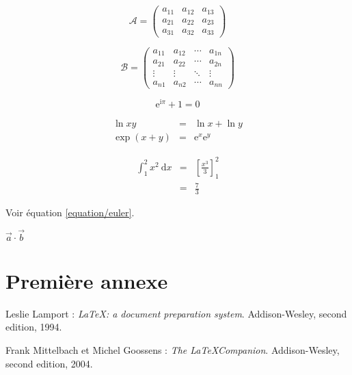 \documentclass[a4paper,11pt]{article}
\newcommand{\diff}{\ \mathrm{d}}
\begin{document}
\[
{\mathcal A} = \left (
\begin{array}{ccc}
a_{11} & a_{12} & a_{13} \\
a_{21} & a_{22} & a_{23} \\
a_{31} & a_{32} & a_{33}
\end{array}
\right )
\]

\[
{\mathcal B} = \left (
\begin{array}{cccc}
a_{11} & a_{12} & \cdots & a_{1n} \\
a_{21} & a_{22} & \cdots & a_{2n} \\
\vdots  & \vdots   & \ddots & \vdots  \\
a_{n1} & a_{n2} & \cdots & a_{nn}
\end{array}
\right )
\]

\begin{equation} \label{equation/euler}
\mathrm{e}^{\mathrm{i}\pi}+1=0
\end{equation}

\begin{eqnarray}
\ln xy                           & = & \ln x + \ln y \\
\exp \left ( x+y \right ) & = & \mathrm{e}^x  \mathrm{e}^y
\end{eqnarray}

\begin{eqnarray}
\int_1^2 x^2 \diff x & = & \left[\frac{x^3}{3}\right ]_1^2 \nonumber \\
                               & = & \frac{7}{3}
\end{eqnarray}

Voir équation \eqref{equation/euler}.

$\vec{a}\cdot\vec{b}$
\appendix
\section{Première annexe}

\begin{thebibliography}{2}

	Leslie Lamport :
	\textit{\LaTeX: a document preparation system}.
	Addison-Wesley, second edition, 1994.

	Frank Mittelbach et Michel Goossens :
	\textit{The \LaTeX Companion}.
	Addison-Wesley, second edition, 2004.

\end{thebibliography}
\end{document}
